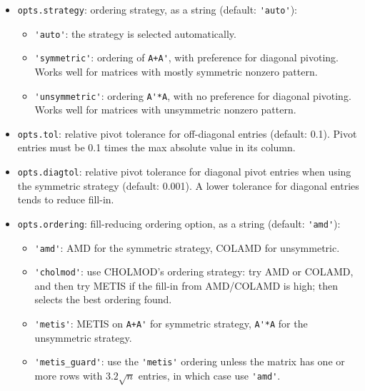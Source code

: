 \documentclass[12pt]{article}
\begin{document}
\begin{itemize}

    \item \verb'opts.strategy':  ordering strategy,
        as a string (default: \verb"'auto'"):

        \begin{itemize}
        \item \verb"'auto'": the strategy is selected automatically.
        \item \verb"'symmetric'": ordering of \verb"A+A'", with preference for
            diagonal pivoting.  Works well for matrices with mostly symmetric
            nonzero pattern.
        \item \verb"'unsymmetric'": ordering \verb"A'*A", with no preference
            for diagonal pivoting.  Works well for matrices with unsymmetric
            nonzero pattern.
        \end{itemize}

    \item \verb'opts.tol':   relative pivot tolerance for off-diagonal entries
    (default: 0.1).  Pivot entries must be 0.1 times the max absolute value in
    its column.

    \item \verb'opts.diagtol':   relative pivot tolerance for diagonal pivot
    entries when using the symmetric strategy (default: 0.001).  A lower
    tolerance for diagonal entries tends to reduce fill-in.

    \item \verb'opts.ordering':  fill-reducing ordering option, as a string
    (default: \verb"'amd'"):

        \begin{itemize}
        \item \verb"'amd'": AMD for the symmetric strategy, COLAMD for
        unsymmetric.

        \item \verb"'cholmod'": use CHOLMOD's ordering strategy: try AMD or
        COLAMD, and then try METIS if the fill-in from AMD/COLAMD is high; then
        selects the best ordering found.

        \item \verb"'metis'": METIS on \verb"A+A'" for symmetric strategy,
            \verb"A'*A" for the unsymmetric strategy.

        \item \verb"'metis_guard'": use the \verb"'metis'" ordering unless the
        matrix has one or more rows with $3.2\sqrt{n}$ entries, in which case
        use \verb"'amd'".


\end{itemize}
\end{itemize}
\end{document}
